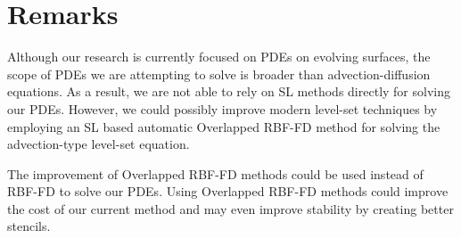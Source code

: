 \documentclass[a4paper,12pt]{article}
\begin{document}
\section*{Remarks}
Although our research is currently focused on PDEs on evolving surfaces, the scope of PDEs we are attempting to solve is broader than advection-diffusion equations. As a result, we are not able to rely on SL methods directly for solving our PDEs. However, we could possibly improve modern level-set techniques by employing an SL based automatic Overlapped RBF-FD method for solving the advection-type level-set equation. 

The improvement of Overlapped RBF-FD methods could be used instead of RBF-FD to solve our PDEs. Using Overlapped RBF-FD methods could improve the cost of our current method and may even improve stability by creating better stencils.



\end{document}
